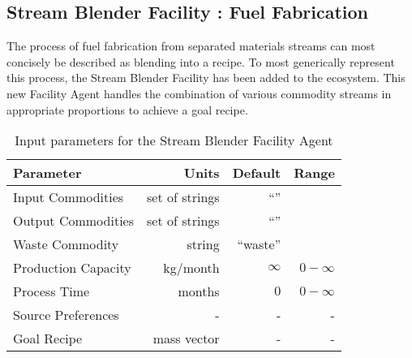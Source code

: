 \subsection{Stream Blender Facility : Fuel Fabrication}

The process of fuel fabrication from separated materials streams can most
concisely be described as blending into a recipe. To most generically represent
this process, the Stream Blender Facility has been added to the \Cyclus 
ecosystem.  This new Facility Agent handles the combination of various 
commodity streams in appropriate proportions to achieve a goal recipe.  

\begin{table}[h!]
\centering
\begin{tabular}{|l|r|r|r|}
\hline
\textbf{Parameter} & \textbf{Units} & \textbf{Default} & \textbf{Range}\\
\hline
Input Commodities & set of strings& ``''& \\
Output Commodities & set of strings&``'' & \\
Waste Commodity & string & ``waste'' & \\
Production Capacity& kg/month& $\infty$& $0-\infty$\\
Process Time& months & $0$ & $0-\infty$ \\
Source Preferences& - & - & - \\
Goal Recipe& mass vector & - & -  \\
\hline
\end{tabular}
\caption{Input parameters for the Stream Blender Facility Agent}
\label{tab:commodconverter}
\end{table}
